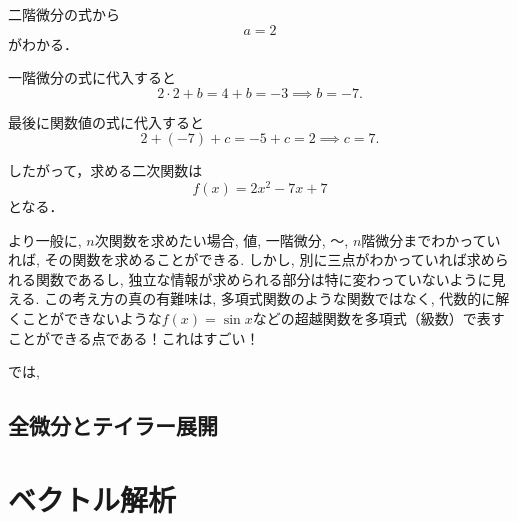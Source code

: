 \documentclass{ltjsarticle}
\begin{document}
二階微分の式から
\[
a = 2
\]
がわかる．

一階微分の式に代入すると
\[
2 \cdot 2 + b = 4 + b = -3 \implies b = -7.
\]

最後に関数値の式に代入すると
\[
2 + (-7) + c = -5 + c = 2 \implies c = 7.
\]

したがって，求める二次関数は
\[
\boxed{f(x) = 2x^2 - 7x + 7}
\]
となる．

より一般に, $n$次関数を求めたい場合, 値, 一階微分, ～, $n$階微分までわかっていれば, その関数を求めることができる. 
しかし, 別に三点がわかっていれば求められる関数であるし, 独立な情報が求められる部分は特に変わっていないように見える. 
この考え方の真の有難味は, 多項式関数のような関数ではなく, 
代数的に解くことができないような$f(x) = \sin x$などの超越関数を多項式（級数）で表すことができる点である！これはすごい！

では, 
\subsection{全微分とテイラー展開}


\section{ベクトル解析}
\end{document}
